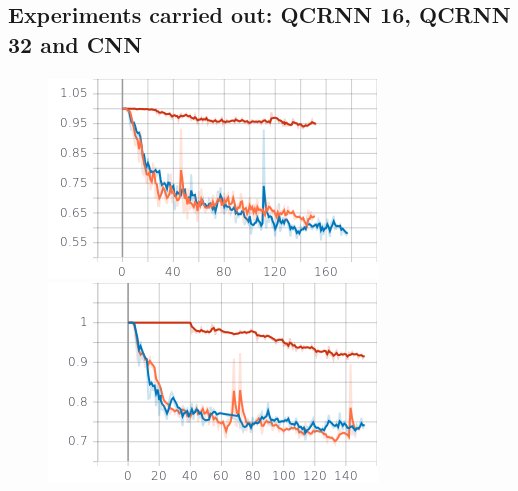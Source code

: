 \documentclass{article}
\begin{document}
    \subsection*{Experiments carried out: QCRNN 16, QCRNN 32 and CNN}
    \paragraph{}
	\begin{figure}[hbt!]
	\centering
	\begin{minipage}{0.35\textwidth}
	  \centering
	  \includegraphics[width=\linewidth]{images/sed_score_ov1.png}
	\end{minipage}%
	\begin{minipage}{.35\textwidth}
	  \centering
	  \includegraphics[width=\linewidth]{images/sed_score_ov2.png}
	\end{minipage}\\
	\vspace{1em}

\end{figure}
\end{document}
